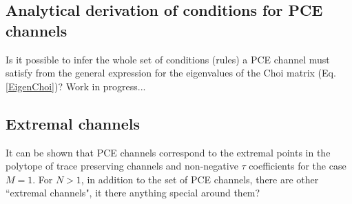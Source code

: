 \subsection{Analytical derivation of conditions for PCE channels}
% 
Is it possible to infer the whole set of conditions (rules) a PCE channel must satisfy from the general expression for the eigenvalues of the Choi matrix (Eq. \ref{EigenChoi})? Work in progress...

% 
\subsection{Extremal channels}
% 
It can be shown that PCE channels correspond to the extremal points in the polytope of trace preserving channels and non-negative $\tau$ coefficients for the case $M=1$. For $N>1$, in addition to the set of PCE channels, there are other  ``extremal channels", it there anything special around them?


